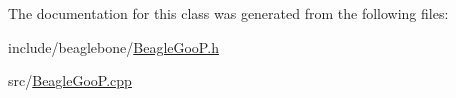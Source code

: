 The documentation for this class was generated from the following files\-:\begin{DoxyCompactItemize}
\item 
include/beaglebone/\hyperlink{_beagle_goo_p_8h}{Beagle\-Goo\-P.\-h}\item 
src/\hyperlink{_beagle_goo_p_8cpp}{Beagle\-Goo\-P.\-cpp}\end{DoxyCompactItemize}
